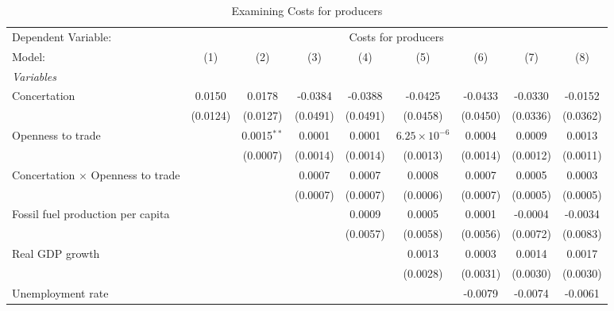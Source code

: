 
\begin{table}[htbp]
   \caption{Examining Costs for producers}
   \centering
   \begin{tabular}{lcccccccc}
      \tabularnewline \midrule \midrule
      Dependent Variable: & \multicolumn{8}{c}{Costs for producers}\\
      Model:                                   & (1)      & (2)           & (3)      & (4)      & (5)                   & (6)      & (7)      & (8)\\  
      \midrule
      \emph{Variables}\\
      Concertation                             & 0.0150   & 0.0178        & -0.0384  & -0.0388  & -0.0425               & -0.0433  & -0.0330  & -0.0152\\   
                                               & (0.0124) & (0.0127)      & (0.0491) & (0.0491) & (0.0458)              & (0.0450) & (0.0336) & (0.0362)\\   
      Openness to trade                        &          & 0.0015$^{**}$ & 0.0001   & 0.0001   & $6.25\times 10^{-6}$  & 0.0004   & 0.0009   & 0.0013\\   
                                               &          & (0.0007)      & (0.0014) & (0.0014) & (0.0013)              & (0.0014) & (0.0012) & (0.0011)\\   
      Concertation $\times$ Openness to trade  &          &               & 0.0007   & 0.0007   & 0.0008                & 0.0007   & 0.0005   & 0.0003\\   
                                               &          &               & (0.0007) & (0.0007) & (0.0006)              & (0.0007) & (0.0005) & (0.0005)\\   
      Fossil fuel production per capita        &          &               &          & 0.0009   & 0.0005                & 0.0001   & -0.0004  & -0.0034\\   
                                               &          &               &          & (0.0057) & (0.0058)              & (0.0056) & (0.0072) & (0.0083)\\   
      Real GDP growth                          &          &               &          &          & 0.0013                & 0.0003   & 0.0014   & 0.0017\\   
                                               &          &               &          &          & (0.0028)              & (0.0031) & (0.0030) & (0.0030)\\   
      Unemployment rate                        &          &               &          &          &                       & -0.0079  & -0.0074  & -0.0061\\   

\end{tabular}
\end{table}
